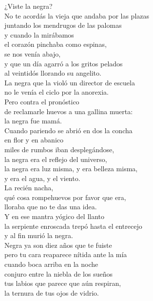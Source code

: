

¿Viste la negra?\\
No te acordás la vieja que andaba por las plazas\\
juntando los mendrugos de las palomas\\
y cuando la mirábamos\\
el corazón pinchaba como espinas,\\
se nos venía abajo,\\
y que un día agarró a los gritos pelados\\
al veintidós llorando su angelito.\\
La negra que la violó un director de escuela\\
no le venía el ciclo por la anorexia.\\
Pero contra el pronóstico\\
de reclamarle huevos a una gallina muerta:\\
la negra fue mamá.\\
Cuando pariendo se abrió en dos la concha\\
en flor y en abanico\\
miles de rumbos iban desplegándose,\\
la negra era el reflejo del universo,\\
la negra era luz misma, y era belleza misma,\\
y era el agua, y el viento.\\
La recién nacha, \\
qué cosa rompehuevos por favor que era,\\
lloraba que no te das una idea.\\
Y en ese mantra yógico del llanto\\
la serpiente enroscada trepó hasta el entrecejo\\
y al fin murió la negra.\\
Negra ya son diez años que te fuiste\\
pero tu cara reaparece nítida ante la mía\\
cuando boca arriba en la noche\\
conjuro entre la niebla de los sueños\\
tus labios que parece que aún respiran,\\
la ternura de tus ojos de vidrio.\\

